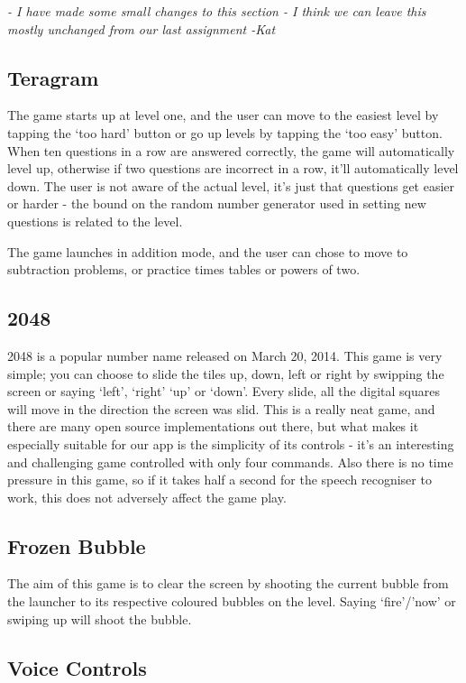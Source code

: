 \documentclass[11pt, oneside]{article}
\begin{document}
{\em - I have made some small changes to this section - I think we can leave this mostly unchanged from our last assignment -Kat}

\subsection{Teragram}

The game starts up at level one, and the user can move to the easiest
level by tapping the `too hard' button or go up levels by tapping the
`too easy' button. When ten questions in a row are answered correctly,
the game will automatically level up, otherwise if two questions are incorrect in a 
row, it'll automatically level down.  The user is not aware of the actual level, it's just that
questions get easier or harder - the bound on the random number
generator used in setting new questions is related to the level.

The game launches in addition mode, and the user can chose to move to
subtraction problems, or practice times tables or powers of two.

\subsection{2048}

2048 is a popular number name released on March 20, 2014. This game is
very simple; you can choose to slide the tiles up, down, left or right
by swipping the screen or saying `left', `right' `up' or `down'. Every
slide, all the digital squares will move in the direction the screen was slid. 
This is a really neat game, and there are many open source
implementations out there, but what makes it especially suitable for
our app is the simplicity of its controls - it's an interesting and
challenging game controlled with only four commands. Also there is no
time pressure in this game, so if it takes half a second for the
speech recogniser to work, this does not adversely affect the game
play.

\subsection{Frozen Bubble}
The aim of this game is to clear the screen by shooting the current
bubble from the launcher to its respective coloured bubbles on the
level. Saying `fire'/'now' or swiping up will shoot the bubble.

\subsection{Voice Controls}
\end{document}
